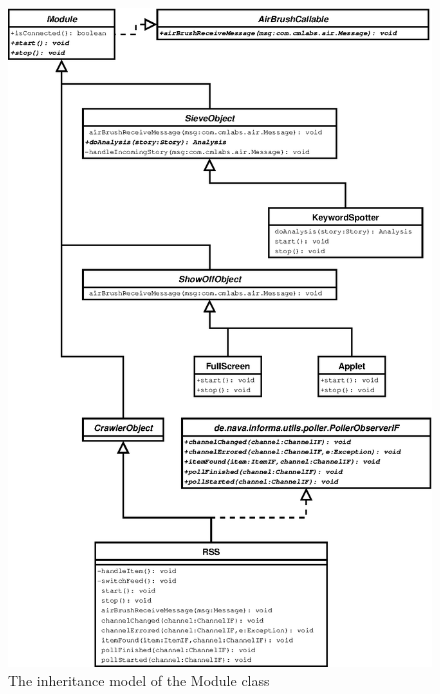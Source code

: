 \begin{figure}[p]
  \centering
  \includegraphics{image/class-diagram-module}
  \caption{The inheritance model of the Module class}
  \label{fig:class-diagram-launcher}
\end{figure}

